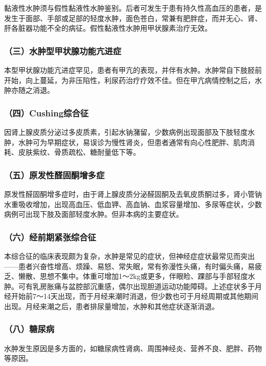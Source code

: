 黏液性水肿须与假性黏液性水肿鉴别。后者可发生于患有持久性高血压的患者，是发生于面部、手部或足部的轻度水肿，面色苍白，常兼有肥胖症，而并无心、肾、肝各脏器功能不全的病征。假性黏液性水肿用甲状腺素治疗无效。

\subsubsection{（三）水肿型甲状腺功能亢进症}

本型甲状腺功能亢进症罕见，患者有甲亢的表现，并伴有水肿。水肿常自下肢胫前开始，向上蔓延，为非压陷性，利尿药治疗疗效不佳。但在甲亢病情控制之后，水肿亦随之消退。

\subsubsection{（四）Cushing综合征}

因肾上腺皮质分泌过多皮质素，引起水钠潴留，少数病例出现面部及下肢轻度水肿，水肿可为早期症状，易误诊为慢性肾炎，但患者通常有向心性肥胖、肌肉消耗、皮肤紫纹、骨质疏松、糖耐量低下等。

\subsubsection{（五）原发性醛固酮增多症}

原发性醛固酮增多症时，由于肾上腺皮质分泌醛固酮及去氧皮质酮过多，肾小管钠水重吸收增加，出现高血压、低血钾、高血钠、血浆容量增加、多尿等症状，少数病例可出现下肢及面部轻度水肿。但非本病的主要症状。

\subsubsection{（六）经前期紧张综合征}

本综合征的临床表现颇为复杂，水肿是常见的症状，但神经症症状最常见而突出------患者兴奋性增高、烦躁、易怒、常失眠，常有弥漫性头痛，有时偏头痛，易疲乏、懒散、思想不集中。体重可增加1～2kg或更多，伴眼睑、踝部与手部轻度水肿。可有乳房胀痛与盆腔部沉重感，偶尔出现胆道运动功能障碍。上述症状多于月经开始前7～14天出现，而于月经来潮时消退，但少数也可于月经周期或其他期间出现。月经来潮之后，患者排尿量增加，水肿和其他症状逐渐消退。

\subsubsection{（八）糖尿病}

水肿发生原因是多方面的，如糖尿病性肾病、周围神经炎、营养不良、肥胖、药物等原因。

